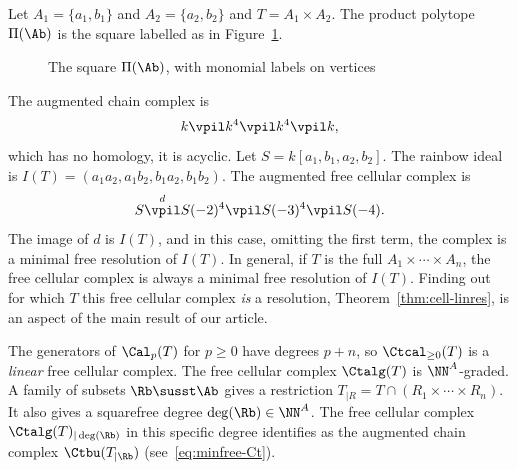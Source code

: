 \begin{exam} Let $A_1 = \{a_1, b_1\}$ and $A_2 = \{ a_2,b_2\}$ and
  $T = A_1 \times A_2$. The product polytope $\Pi (\Ab)$ is the
  square labelled as in Figure~\ref{fig:cell-square}.

\begin{figure}[ht]
\begin{center}


\end{center}
\caption{The square $\Pi(\Ab)$, with monomial labels on vertices}
\label{fig:cell-square}
\end{figure}
  The augmented chain complex is
  \[ k \vpil k^4 \vpil k^4 \vpil k, \]
  which has no homology, it is acyclic.
  Let $S = k[a_1,b_1, a_2, b_2]$. The rainbow ideal is
  $I(T) = (a_1a_2, a_1b_2, b_1a_2, b_1b_2)$. The augmented  free cellular complex is
  \[ S \overset{d}{\vpil} S(-2)^4 \vpil S(-3)^4 \vpil S(-4). \]
  The image of $d$ is $I(T)$, and in this case,
  omitting the first term,  the complex is a minimal free resolution of $I(T)$. 
In general, if $T$ is the full $A_1 \times \cdots \times A_n$, the free cellular
complex is always a minimal free resolution of $I(T)$. Finding out for
which $T$ this free cellular
complex {\it is} a resolution, Theorem~\ref{thm:cell-linres},
is an aspect of the main result of our article. 
\end{exam}

\setcounter{fact}{0}
The generators of $\Cal_p(T)$ for $p \geq 0$ have degrees $p+n$,
so $\Ctcal_{\geq 0}(T)$ is a {\it linear}
free cellular complex.
The free cellular complex $\Ctalg(T)$ is $\NN^A$-graded. A family of subsets
$\Rb \susst \Ab$ gives a restriction
$T_{|R} = T \cap (R_1 \times \cdots \times R_n)$. 
It also gives a squarefree degree $\deg(\Rb) \in \NN^A$.
The free cellular complex  $\Ctalg(T)_{|\deg(\Rb)}$ in this specific degree
identifies as the augmented chain complex $\Ctbu(T_{|\Rb})$
(see~\eqref{eq:minfree-Ct}).

